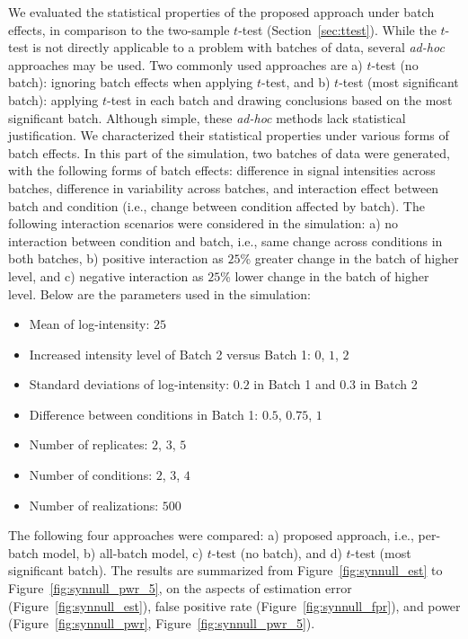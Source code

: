 \documentclass{mcp}
\def\sfigref#1{{Figure~\ref{#1}}}
\def\secref#1{Section~\ref{#1}}
\begin{document}
We evaluated the statistical properties of the proposed approach under batch effects, in comparison to the two-sample $t$-test (\secref{sec:ttest}). While the $t$-test is not directly applicable to a problem with batches of data, several \textit{ad-hoc} approaches may be used. Two commonly used approaches are a) $t$-test (no batch): ignoring batch effects when applying $t$-test, and b) $t$-test (most significant batch): applying $t$-test in each batch and drawing conclusions based on the most significant batch. Although simple, these \textit{ad-hoc} methods lack statistical justification. We characterized their statistical properties under various forms of batch effects. In this part of the simulation, two batches of data were generated, with the following forms of batch effects: difference in signal intensities across batches, difference in variability across batches, and interaction effect between batch and condition (i.e., change between condition affected by batch). The following interaction scenarios were considered in the simulation: a) no interaction between condition and batch, i.e., same change across conditions in both batches, b) positive interaction as $25$\% greater change in the batch of higher level, and c) negative interaction as $25$\% lower change in the batch of higher level. Below are the parameters used in the simulation: 
\begin{itemize}
\item Mean of log-intensity: $25$
\item Increased intensity level of Batch 2 versus Batch 1: $0$, $1$, $2$
\item Standard deviations of log-intensity: $0.2$ in Batch 1 and $0.3$ in Batch 2
\item Difference between conditions in Batch 1: $0.5$, $0.75$, $1$
\item Number of replicates: $2$, $3$, $5$
\item Number of conditions: $2$, $3$, $4$
\item Number of realizations: $500$
\end{itemize}
The following four approaches were compared: a) proposed approach, i.e., per-batch model, b) all-batch model, c) $t$-test (no batch), and d) $t$-test (most significant batch). The results are summarized from \sfigref{fig:synnull_est} to \sfigref{fig:synnull_pwr_5}, on the aspects of estimation error (\sfigref{fig:synnull_est}), false positive rate (\sfigref{fig:synnull_fpr}), and power (\sfigref{fig:synnull_pwr}, \sfigref{fig:synnull_pwr_5}). 
\end{document}
